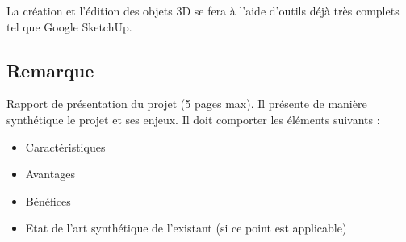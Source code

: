 La création et l'édition des objets 3D se fera à l'aide d'outils déjà très complets tel que Google SketchUp.


\subsection{Remarque}


Rapport de présentation du projet (5 pages max). Il présente de manière synthétique  le projet et ses enjeux. Il doit comporter les éléments suivants :
\begin{itemize}
 \item Caractéristiques
 \item Avantages
 \item Bénéfices
 \item Etat de l’art synthétique de l’existant (si ce point est applicable)
\end{itemize}